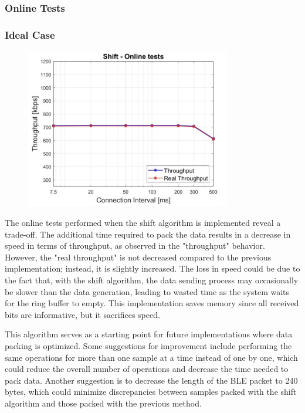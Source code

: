 \documentclass{Configuration_Files/PoliMi3i_thesis}
\begin{document}
\subsubsection*{Online Tests}
\subsubsection*{Ideal Case}

\begin{figure}[H]
    \centering
    \includegraphics[width=0.8\textwidth]{Results Manuel/figure15}
    \label{fig:figure1}
\end{figure}

The online tests performed when the shift algorithm is implemented reveal a trade-off. The additional time required to pack the data results in a decrease in speed in terms of throughput, as observed in the "throughput" behavior. However, the "real throughput" is not decreased compared to the previous implementation; instead, it is slightly increased. The loss in speed could be due to the fact that, with the shift algorithm, the data sending process may occasionally be slower than the data generation, leading to wasted time as the system waits for the ring buffer to empty. This implementation saves memory since all received bits are informative, but it sacrifices speed.

This algorithm serves as a starting point for future implementations where data packing is optimized. Some suggestions for improvement include performing the same operations for more than one sample at a time instead of one by one, which could reduce the overall number of operations and decrease the time needed to pack data. Another suggestion is to decrease the length of the BLE packet to 240 bytes, which could minimize discrepancies between samples packed with the shift algorithm and those packed with the previous method.
\end{document}
